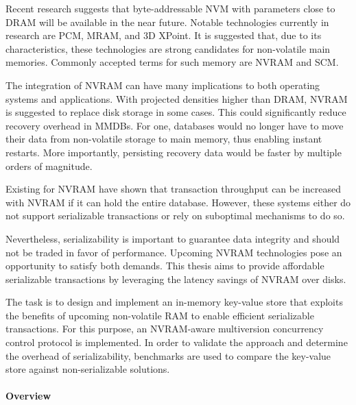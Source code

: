 
Recent research suggests that byte-addressable \ac{NVM} with parameters close to
\ac{DRAM} will be available in the near future. Notable technologies currently
in research are \ac{PCM}, \ac{MRAM}, and 3D XPoint. It is suggested that, due to
its characteristics, these technologies are strong candidates for non-volatile
main memories. Commonly accepted terms for such memory are \ac{NVRAM} and
\ac{SCM}.


The integration of \ac{NVRAM} can have many implications to both operating
systems and applications. With projected densities higher than \ac{DRAM},
\ac{NVRAM} is suggested to replace disk storage in some cases. This could
significantly reduce recovery overhead in \acp{MMDB}. For one, databases would
no longer have to move their data from non-volatile storage to main memory, thus
enabling instant restarts. More importantly, persisting recovery data would be
faster by multiple orders of magnitude.

Existing \kvsp for \ac{NVRAM} have shown that transaction throughput can be
increased with \ac{NVRAM} if it can hold the entire database. However, these
systems either do not support serializable transactions or rely on suboptimal
mechanisms to do so.

Nevertheless, serializability is important to guarantee data integrity and
should not be traded in favor of performance. Upcoming \ac{NVRAM} technologies pose
an opportunity to satisfy both demands. This thesis aims to provide affordable
serializable transactions by leveraging the latency savings of \ac{NVRAM} over
disks.



The task is to design and implement an in-memory key-value store that exploits
the benefits of upcoming non-volatile \ac{RAM} to enable efficient serializable
transactions. For this purpose, an \ac{NVRAM}-aware multiversion concurrency control
protocol is implemented. In order to validate the approach and determine the
overhead of serializability, benchmarks are used to compare the key-value store
against non-serializable solutions.


\paragraph{Overview}

